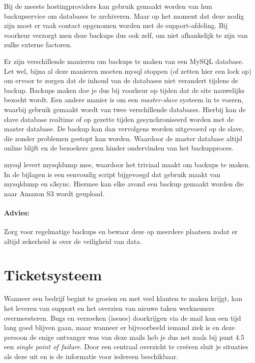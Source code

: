 Bij de meeste hostingproviders kan gebruik gemaakt worden van hun backupservice om databases te archiveren. Maar op het moment dat deze nodig zijn moet er vaak contact opgenomen worden met de support-afdeling. Bij voorkeur verzorgt men deze backups dus ook zelf, om niet afhankelijk te zijn van zulke externe factoren.

Er zijn verschillende manieren om backups te maken van een MySQL database. Let wel, bijna al deze manieren moeten {\sc mysql} stoppen (of zetten hier een lock op) om ervoor te zorgen dat de inhoud van de databases niet verandert tijdens de backup. Backups maken doe je dus bij voorkeur op tijden dat de site nauwelijks bezocht wordt. Een andere manier is om een \emph{master-slave} systeem in te voeren, waarbij gebruik gemaakt wordt van twee verschillende databases. Hierbij kan de slave database realtime of op gezette tijden gesynchroniseerd worden met de master database. De backup kan dan vervolgens worden uitgevoerd op de slave, die zonder problemen gestopt kan worden. Waardoor de master database altijd online blijft en de bezoekers geen hinder ondervinden van het backupproces.

{\sc mysql} levert mysqldump mee, waardoor het triviaal maakt om backups te maken. In de bijlagen is een eenvoudig script bijgevoegd dat gebruik maakt van mysqldump en s3sync. Hiermee kan elke avond een backup gemaakt worden die naar Amazon S3 wordt geupload.

\paragraph{Advies:} Zorg voor regelmatige backups en bewaar deze op meerdere plaatsen zodat er altijd zekerheid is over de veiligheid van data.

\section{Ticketsysteem}

Wanneer een bedrijf begint te groeien en met veel klanten te maken krijgt, kan het leveren van support en het overzien van nieuwe taken werknemers overmeesteren. Bugs en verzoeken (issues) doorkrijgen via de mail kan een tijd lang goed blijven gaan, maar wanneer er bijvoorbeeld iemand ziek is en deze persoon de enige ontvanger was van deze mails heb je dus net zoals bij punt 4.5 een \emph{single point of failure}. Door een centraal overzicht te creëren sluit je situaties als deze uit en is de informatie voor iedereen beschikbaar.

